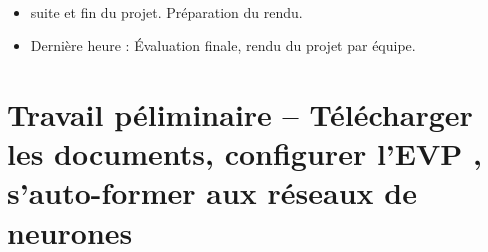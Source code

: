 \documentclass[11pt,french]{article}
\begin{document}
%
\vspace*{-8mm}
\begin {bclogo}[noborder=true, couleurBarre=Chocolate, logo=\large\ding{220}]{}
  \vspace*{-4mm}\\[-5mm]
  \begin{itemize}
    \item suite et fin du projet. Préparation du rendu.
    \item Dernière heure : Évaluation finale, rendu du projet par équipe.
  \end{itemize}
\end{bclogo}  

\newpage
\vspace*{-16mm}
\section*{ Travail péliminaire -- Télécharger les documents, configurer l'EVP , s'auto-former aux réseaux de neurones}
\end{document}
